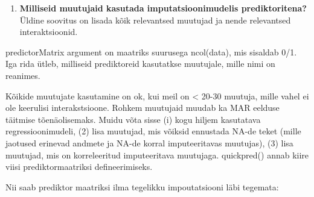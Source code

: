\documentclass[]{book}
\newenvironment{Shaded}{\begin{snugshade}}{\end{snugshade}}
\newcommand{\CommentTok}[1]{\textcolor[rgb]{0.56,0.35,0.01}{\textit{#1}}}
\newcommand{\DataTypeTok}[1]{\textcolor[rgb]{0.13,0.29,0.53}{#1}}
\newcommand{\DecValTok}[1]{\textcolor[rgb]{0.00,0.00,0.81}{#1}}
\newcommand{\KeywordTok}[1]{\textcolor[rgb]{0.13,0.29,0.53}{\textbf{#1}}}
\newcommand{\NormalTok}[1]{#1}
\newcommand{\OperatorTok}[1]{\textcolor[rgb]{0.81,0.36,0.00}{\textbf{#1}}}
\newcommand{\OtherTok}[1]{\textcolor[rgb]{0.56,0.35,0.01}{#1}}
\newcommand{\StringTok}[1]{\textcolor[rgb]{0.31,0.60,0.02}{#1}}
\providecommand{\tightlist}{%
  \setlength{\itemsep}{0pt}\setlength{\parskip}{0pt}}
\begin{document}
\begin{enumerate}
\def\labelenumi{\arabic{enumi}.}
\setcounter{enumi}{2}
\tightlist
\item
  \textbf{Milliseid muutujaid kasutada imputatsioonimudelis prediktoritena?} Üldine soovitus on lisada kõik relevantsed muutujad ja nende relevantsed interaktsioonid.
\end{enumerate}

predictorMatrix argument on maatriks suurusega ncol(data), mis sisaldab 0/1. Iga rida ütleb, milliseid prediktoreid kasutatkse muutujale, mille nimi on reanimes.

\begin{Shaded}
\end{Shaded}

Kõikide muutujate kasutamine on ok, kui meil on \textless{} 20-30 muutuja, mille vahel ei ole keerulisi interakstsioone. Rohkem muutujaid muudab ka MAR eelduse täitmise tõenäolisemaks. Muidu võta sisse (i) kogu hiljem kasutatava regressioonimudeli, (2) lisa muutujad, mis võiksid ennustada NA-de teket (mille jaotused erinevad andmete ja NA-de korral imputeeritavas muutujas), (3) lisa muutujad, mis on korreleeritud imputeeritava muutujaga. quickpred() annab kiire viisi prediktormaatriksi defineerimiseks.

Nii saab prediktor maatriksi ilma tegelikku impoutatsiooni läbi tegemata:

\begin{Shaded}
\end{Shaded}
\end{document}
